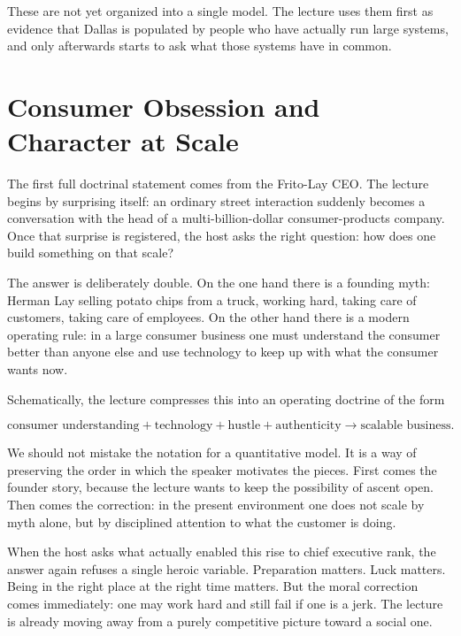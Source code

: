These are not yet organized into a single model. The lecture uses them first as evidence that Dallas is populated by people who have actually run large systems, and only afterwards starts to ask what those systems have in common.

\section{Consumer Obsession and Character at Scale}

The first full doctrinal statement comes from the Frito-Lay CEO. The lecture begins by surprising itself: an ordinary street interaction suddenly becomes a conversation with the head of a multi-billion-dollar consumer-products company. Once that surprise is registered, the host asks the right question: how does one build something on that scale?

The answer is deliberately double. On the one hand there is a founding myth: Herman Lay selling potato chips from a truck, working hard, taking care of customers, taking care of employees. On the other hand there is a modern operating rule: in a large consumer business one must understand the consumer better than anyone else and use technology to keep up with what the consumer wants now.

Schematically, the lecture compresses this into an operating doctrine of the form

\begin{equation}
\text{consumer understanding} + \text{technology} + \text{hustle} + \text{authenticity}
\longrightarrow
\text{scalable business}.
\end{equation}

We should not mistake the notation for a quantitative model. It is a way of preserving the order in which the speaker motivates the pieces. First comes the founder story, because the lecture wants to keep the possibility of ascent open. Then comes the correction: in the present environment one does not scale by myth alone, but by disciplined attention to what the customer is doing.

When the host asks what actually enabled this rise to chief executive rank, the answer again refuses a single heroic variable. Preparation matters. Luck matters. Being in the right place at the right time matters. But the moral correction comes immediately: one may work hard and still fail if one is a jerk. The lecture is already moving away from a purely competitive picture toward a social one.

